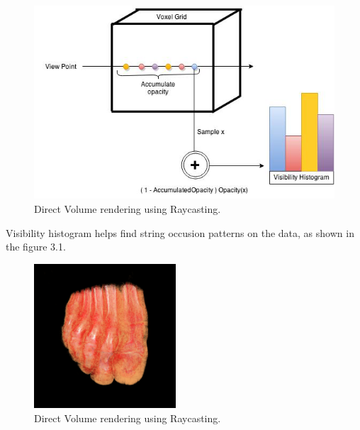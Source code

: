 \begin{figure}
\centering
\includegraphics[width=350pt]{Images/VHistogram.jpg}
\caption{\label{fig:ray_cast1.jpg} Direct Volume rendering using Raycasting.}
\end{figure}


Visibility histogram helps find string occusion patterns on the data, as shown in the figure 3.1. 


\begin{figure}
\centering
\includegraphics[width=150pt]{Images/foot_1.png}
\caption{\label{fig:ray_cast1.jpg} Direct Volume rendering using Raycasting.}
\end{figure}






   

